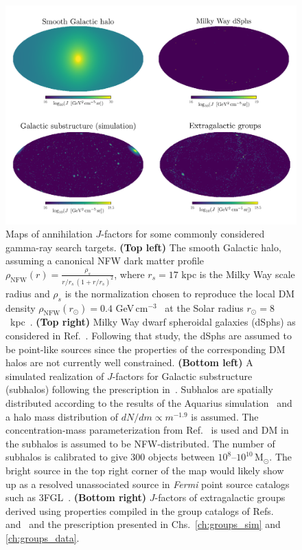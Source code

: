 \begin{figure}[htbp] 
\centering
 \includegraphics[width=1.0\textwidth]{ch-intro/jfactors.pdf}
\caption{Maps of annihilation $J$-factors for some commonly considered gamma-ray search targets. \textbf{(Top left)} The smooth Galactic halo, assuming a canonical NFW dark matter profile $\rho_\text{NFW}(r)=\frac{\rho_{s}}{r/r_{s}\,(1+r/r_{s})^{2}}$, where $r_s=17$ kpc is the Milky Way scale radius and $\rho_s$ is the normalization chosen to reproduce the local DM density $\rho_\text{NFW}(r_\odot) = 0.4$ GeV$\,$cm$^{-3}$~\cite{2015ApJ...814...13M,Sivertsson:2017rkp} at the Solar radius $r_\odot = 8$~kpc~\cite{Read:2014qva}. \textbf{(Top right)} Milky Way dwarf spheroidal galaxies (dSphs) as considered in Ref.~\cite{Fermi-LAT:2016uux}. Following that study, the dSphs are assumed to be point-like sources since the properties of the corresponding DM halos are not currently well constrained. \textbf{(Bottom left)} A simulated realization of $J$-factors for Galactic substructure (subhalos) following the prescription in~\cite{Hutten:2016jko}. Subhalos are spatially distributed according to the results of the Aquarius simulation~\cite{Springel:2008cc} and a halo mass distribution of $dN/dm\propto m^{-1.9}$ is assumed. The concentration-mass parameterization from Ref.~\cite{Sanchez-Conde:2013yxa} is used and DM in the subhalos is assumed to be NFW-distributed. The number of subhalos is calibrated to give 300 objects between $10^8$--$10^{10}$\,M$_\odot$. The bright source in the top right corner of the map would likely show up as a resolved unassociated source in \emph{Fermi} point source catalogs such as 3FGL~\cite{Bertoni:2015mla}. \textbf{(Bottom right)} $J$-factors of extragalactic groups derived using properties compiled in the group catalogs of Refs.~\cite{Tully:2015opa} and~\cite{2017ApJ...843...16K} and the prescription presented in Chs.~\ref{ch:groups_sim} and \ref{ch:groups_data}.}  
\label{fig:sources}
\end{figure}


